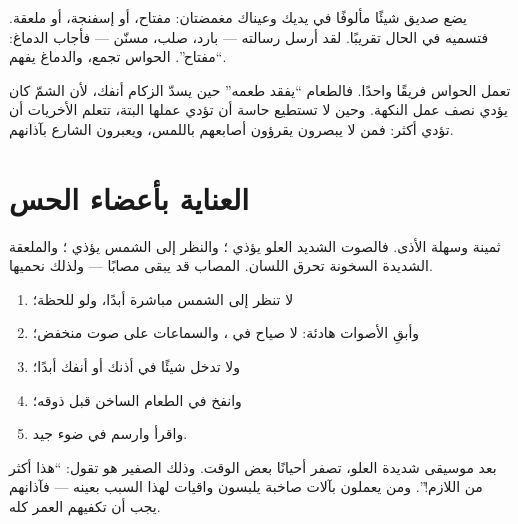 \begin{example}\label{ex:g1:the-five-senses:dark}
يضع صديق شيئًا مألوفًا في يديك وعيناك مغمضتان: مفتاح، أو إسفنجة،
أو ملعقة. فتسميه في الحال تقريبًا. لقد أرسل  رسالته --- بارد،
صلب، مسنّن --- فأجاب الدماغ: ``مفتاح''. الحواس تجمع، والدماغ يفهم.
\end{example}

\begin{remark}\label{rem:g1:the-five-senses:together}
تعمل الحواس فريقًا واحدًا. فالطعام ``يفقد طعمه'' حين يسدّ الزكام
أنفك، لأن الشمّ كان يؤدي نصف عمل النكهة. وحين لا تستطيع حاسة أن
تؤدي عملها البتة، تتعلم الأخريات أن تؤدي أكثر: فمن لا يبصرون
يقرؤون  أصابعهم باللمس، ويعبرون الشارع بآذانهم.
\end{remark}

\section{العناية بأعضاء الحس}

\begin{proposition}[أبواب هشّة]\label{prop:g1:the-five-senses:fragile}
 ثمينة وسهلة الأذى. فالصوت الشديد العلو يؤذي ؛
والنظر إلى الشمس يؤذي ؛ والملعقة الشديدة السخونة تحرق
اللسان.  المصاب قد يبقى مصابًا --- ولذلك نحميها.
\end{proposition}
\admitted

\begin{method}\label{met:g1:the-five-senses:protect}
\begin{enumerate}
  \item لا تنظر إلى الشمس مباشرة أبدًا، ولو للحظة؛
  \item وأبقِ الأصوات هادئة: لا صياح في ، والسماعات على صوت
        منخفض؛
  \item ولا تدخل شيئًا في أذنك أو أنفك أبدًا؛
  \item وانفخ في الطعام الساخن قبل ذوقه؛
  \item واقرأ وارسم في ضوء جيد.
\end{enumerate}
\end{method}

\begin{example}\label{ex:g1:the-five-senses:loud}
بعد موسيقى شديدة العلو، تصفر  أحيانًا بعض الوقت. وذلك
الصفير هو  تقول: ``هذا أكثر من اللازم!''. ومن يعملون بآلات
صاخبة يلبسون واقيات  لهذا السبب بعينه --- فآذانهم يجب أن
تكفيهم العمر كله.
\end{example}

